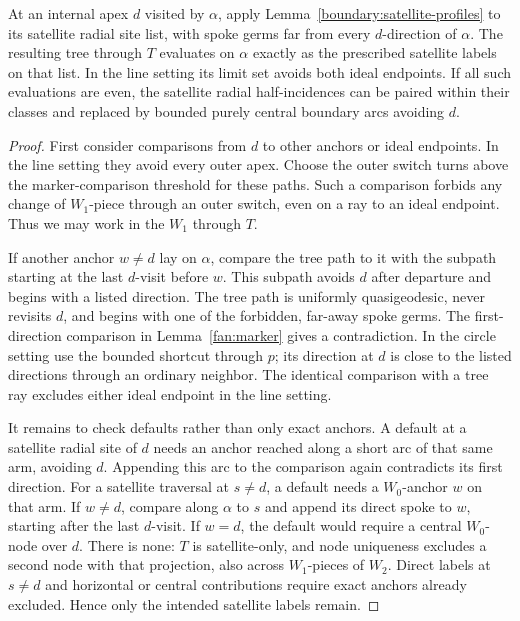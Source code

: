 \begin{lemma}\label{boundary:satellite-test}
At an internal apex $d$ visited by $\alpha$, apply
Lemma~\ref{boundary:satellite-profiles} to its satellite radial site list,
with spoke germs far from every $d$-direction of $\alpha$. The resulting
tree through $T$ evaluates on $\alpha$ exactly as the prescribed satellite
labels on that list. In the line setting its limit set avoids both ideal
endpoints. If all such evaluations are even, the satellite radial
half-incidences can be paired within their classes and replaced by bounded
purely central boundary arcs avoiding $d$.
\end{lemma}

\begin{proof}
First consider comparisons from $d$ to other anchors or ideal endpoints.
In the line setting they avoid every outer apex. Choose the outer switch
turns above the marker-comparison threshold for these paths. Such a
comparison forbids any change of $W_1$-piece through an outer switch, even
on a ray to an ideal endpoint. Thus we may work in the $W_1$ through $T$.

If another anchor $w\ne d$ lay on $\alpha$, compare the tree path to it
with the subpath starting at the last $d$-visit before $w$. This subpath
avoids $d$ after departure and begins with a listed direction. The tree
path is uniformly quasigeodesic, never revisits $d$, and begins with one
of the forbidden, far-away spoke germs. The first-direction comparison
in Lemma~\ref{fan:marker} gives a contradiction. In the circle setting use
the bounded shortcut through $p$; its direction at $d$ is close to the
listed directions through an ordinary neighbor. The identical comparison
with a tree ray excludes either ideal endpoint in the line setting.

It remains to check defaults rather than only exact anchors. A default at
a satellite radial site of $d$ needs an anchor reached along a short arc
of that same arm, avoiding $d$. Appending this arc to the comparison again
contradicts its first direction. For a satellite traversal at $s\ne d$,
a default needs a $W_0$-anchor $w$ on that arm. If $w\ne d$, compare along
$\alpha$ to $s$ and append its direct spoke to $w$, starting after the last
$d$-visit. If $w=d$, the default would require a central $W_0$-node over
$d$. There is none: $T$ is satellite-only, and node uniqueness excludes a
second node with that projection, also across $W_1$-pieces of $W_2$.
Direct labels at $s\ne d$ and horizontal or central contributions require
exact anchors already excluded. Hence only the intended satellite labels
remain.


\end{proof}
